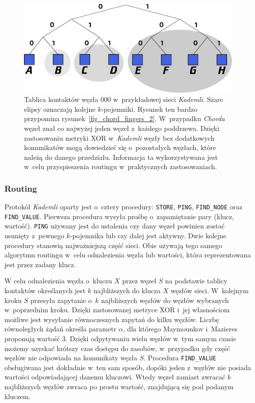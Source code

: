 \documentclass[a4paper,11pt]{scrartcl}
\newcommand{\f}{\texttt}
\begin{document}
\begin{figure}[h]
\centering
\includegraphics[width=0.9\linewidth]{img/kademlia.pdf}
\caption{Tablica kontaktów węzła $000$ w~przykładowej sieci \textit{Kademli}. Szare elipsy oznaczają kolejne $k$-pojemniki. Rysunek ten bardzo przypomina rysunek~\ref{fig_chord_fingers_2}. W~przypadku \textit{Chorda} węzeł znał co najwyżej jeden węzeł z~każdego poddrzewa. Dzięki zastosowaniu metryki XOR w~\textit{Kademli} węzły bez dodatkowych komunikatów mogą dowiedzieć się o~pozostałych węzłach, które należą do danego przedziału. Informacja ta wykorzystywana jest w~celu przyspieszenia routingu w~praktycznych zastosowaniach.}
\label{fig_kademlia}
\end{figure}

\subsubsection{Routing}
\label{kad_routing}
Protokół \textit{Kademli} oparty jest o~cztery procedury: \f{STORE}, \f{PING}, \f{FIND\_NODE} oraz \f{FIND\_VALUE}. Pierwsza procedura wysyła prośbę o~zapamiętanie pary (klucz, wartość). \f{PING} używany jest do ustalenia czy dany węzeł powinien zostać usunięty z~pewnego $k$-pojemnika lub czy dalej jest aktywny. Dwie kolejne procedury stanowią najważniejszą część sieci. Obie używają tego samego algorytmu routingu w~celu odnalezienia węzła lub wartości, która reprezentowana jest przez zadany klucz.

W celu odnalezienia węzła o~kluczu $X$ przez węzeł $S$ na podstawie tablicy kontaktów określanych jest $k$ najbliższych do klucza $X$ węzłów sieci. W~kolejnym kroku $S$ przesyła zapytanie o~$k$ najbliższych węzłów do węzłów wybranych w~poprzednim kroku. Dzięki zastosowanej metryce XOR i~jej własnościom możliwe jest wysyłanie równoczesnych zapytań do kilku węzłów. Liczbę równoległych żądań określa parametr $\alpha$, dla którego Maymounkov i~Mazieres proponują wartość 3. Dzięki odpytywaniu wielu węzłów w~tym samym czasie możemy uzyskać krótszy czas dostępu do zasobów, w~przypadku gdy część węzłów nie odpowiada na komunikaty węzła $S$. Procedura \f{FIND\_VALUE} obsługiwana jest dokładnie w~ten sam sposób, dopóki jeden z~węzłów nie posiada wartości odpowiadającej danemu kluczowi. Wtedy węzeł zamiast zwracać $k$ najbliższych węzłów zwraca po prostu wartość, znajdującą się pod podanym kluczem.
\end{document}
